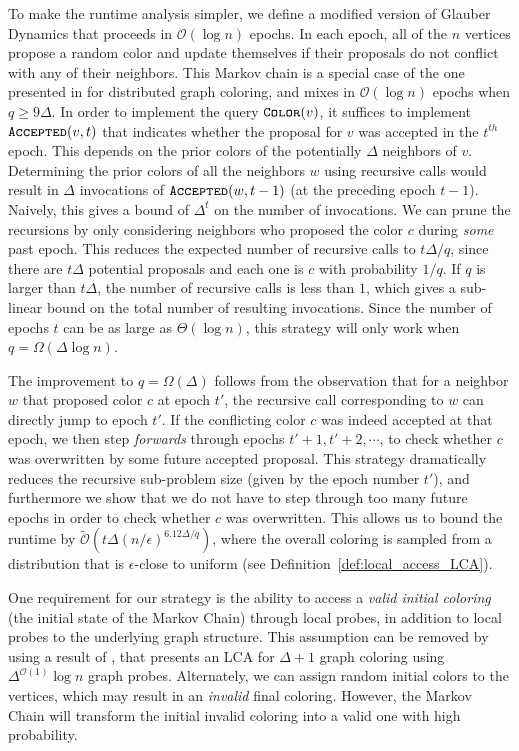 To make the runtime analysis simpler, we define a modified version of Glauber Dynamics that proceeds in $\mathcal O(\log n)$ epochs.
In each epoch, all of the $n$ vertices propose a random color and update themselves if their proposals do not conflict with any of their neighbors.
This Markov chain is a special case of the one presented in \cite{ghaffari_fischer} for distributed graph coloring,
and mixes in $\mathcal O(\log n)$ epochs when $q\ge 9\Delta$.
In order to implement the query $\texttt{\textsc{Color}}(v)$, it suffices to implement $\texttt{\textsc{Accepted}}(v,t)$
that indicates whether the proposal for $v$ was accepted in the $t^{th}$ epoch.
This depends on the prior colors of the potentially $\Delta$ neighbors of $v$.
Determining the prior colors of all the neighbors $w$ using recursive calls would result in
$\Delta$ invocations of $\texttt{\textsc{Accepted}}(w, t-1)$ (at the preceding epoch $t-1$).
Naively, this gives a bound of $\Delta^t$ on the number of invocations.
We can prune the recursions by only considering neighbors who proposed the color $c$ during \emph{some} past epoch.
This reduces the expected number of recursive calls to $t\Delta/q$,
since there are $t\Delta$ potential proposals and each one is $c$ with probability $1/q$.
If $q$ is larger than $t\Delta$, the number of recursive calls is less than $1$,
which gives a sub-linear bound on the total number of resulting invocations.
Since the number of epochs $t$ can be as large as $\Theta(\log n)$, this strategy will only work when $q = \Omega(\Delta\log n)$.

The improvement to $q = \Omega(\Delta)$ follows from the observation that for a neighbor $w$ that proposed color $c$ at epoch $t'$,
the recursive call corresponding to $w$ can directly jump to epoch $t'$.
If the conflicting color $c$ was indeed accepted at that epoch,
we then step \emph{forwards} through epochs $t'+1, t'+2,\cdots$, to check whether $c$ was overwritten by some future accepted proposal.
This strategy dramatically reduces the recursive sub-problem size (given by the epoch number $t'$),
and furthermore we show that we do not have to step through too many future epochs in order to check whether $c$ was overwritten.
This allows us to bound the runtime by $\widetilde{\mathcal O}\left(t\Delta (n/\epsilon)^{6.12\Delta/q}\right)$,
where the overall coloring is sampled from a distribution that is $\epsilon$-close to uniform (see Definition~\ref{def:local_access_LCA}).

One requirement for our strategy is the ability to access a \emph{valid initial coloring} (the initial state of the Markov Chain)
through local probes, in addition to local probes to the underlying graph structure.
This assumption can be removed by using a result of \cite{coloring_initialize},
that presents an LCA for $\Delta+1$ graph coloring using $\Delta^{\mathcal O(1)}\log n$ graph probes.
Alternately, we can assign random initial colors to the vertices, which may result in an \emph{invalid} final coloring.
However, the Markov Chain will transform the initial invalid coloring into a valid one with high probability.
